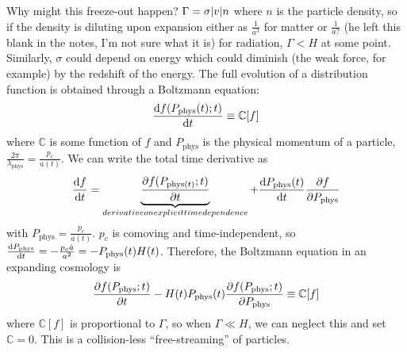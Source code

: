 \documentclass[a4paper,twoside,master.tex]{subfiles}
\begin{document}
Why might this freeze-out happen? $ \Gamma = \sigma \abs{v} n $ where $ n $ is the particle density, so if the density is diluting upon expansion either as $ \frac{1}{a^3} $ for matter or $ \frac{1}{a?} $ (he left this blank in the notes, I'm not sure what it is) for radiation, $ \Gamma \lt H $ at some point. Similarly, $ \sigma $ could depend on energy which could diminish (the weak force, for example) by the redshift of the energy. The full evolution of a distribution function is obtained through a Boltzmann equation:
\begin{equation}
    \dv{f(P_{\text{phys}}(t) ; t)}{t} \equiv \mathbb{C}[f]
\end{equation}
where $ \mathbb{C} $ is some function of $ f $ and $ P_{\text{phys}} $ is the physical momentum of a particle, $ \frac{2 \pi}{\lambda_{\text{phys}}} = \frac{p_c}{a(t)} $. We can write the total time derivative as
\begin{equation}
    \dv{f}{t} = \underbrace{\pdv{f(P_{\text{phys} (t)} ; t)}{t}}_{derivative on explicit time dependence} + \dv{P_{\text{phys}}(t)}{t} \pdv{f}{P_{\text{phys}}}
\end{equation}
with $ P_{\text{phys}} = \frac{p_c}{a(t)} $. $ p_c $ is comoving and time-independent, so $ \dv{P_{\text{phys}}}{t} = - \frac{p_c \dot{a}}{a^2} = - P_{\text{phys}}(t) H(t) $. Therefore, the Boltzmann equation in an expanding cosmology is
\begin{equation}
    \pdv{f(P_{\text{phys}} ; t)}{t} - H(t) P_{\text{phys}}(t) \pdv{f(P_{\text{phys}} ; t)}{P_{\text{phys}}} \equiv \mathbb{C}[f]
\end{equation}
where $ \mathbb{C}[f] $ is proportional to $ \Gamma $, so when $ \Gamma \ll H $, we can neglect this and set $ \mathbb{C} = 0 $. This is a collision-less ``free-streaming'' of particles.
\end{document}
